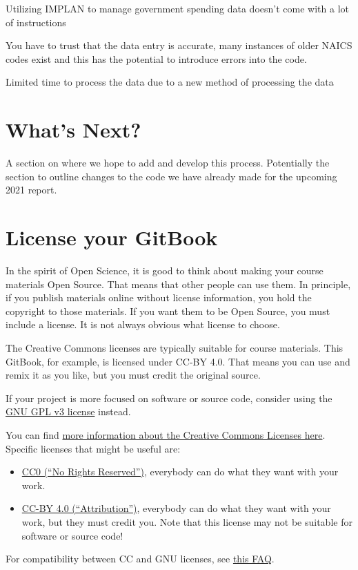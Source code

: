 \documentclass[
]{book}
\providecommand{\tightlist}{%
  \setlength{\itemsep}{0pt}\setlength{\parskip}{0pt}}
\begin{document}
Utilizing IMPLAN to manage government spending data doesn't come with a lot of instructions

You have to trust that the data entry is accurate, many instances of older NAICS codes exist and this has the potential to introduce errors into the code.

Limited time to process the data due to a new method of processing the data

\hypertarget{whats-next}{%
\chapter{What's Next?}\label{whats-next}}

A section on where we hope to add and develop this process. Potentially the section to outline changes to the code we have already made for the upcoming 2021 report.

\hypertarget{license-your-gitbook}{%
\chapter{License your GitBook}\label{license-your-gitbook}}

In the spirit of Open Science, it is good to think about making your course materials Open Source. That means that other people can use them. In principle, if you publish materials online without license information, you hold the copyright to those materials. If you want them to be Open Source, you must include a license. It is not always obvious what license to choose.

The Creative Commons licenses are typically suitable for course materials. This GitBook, for example, is licensed under CC-BY 4.0. That means you can use and remix it as you like, but you must credit the original source.

If your project is more focused on software or source code, consider using the \href{https://www.gnu.org/licenses/gpl-3.0.en.html}{GNU GPL v3 license} instead.

You can find \href{https://creativecommons.org/share-your-work/licensing-examples}{more information about the Creative Commons Licenses here}. Specific licenses that might be useful are:

\begin{itemize}
\tightlist
\item
  \href{https://creativecommons.org/share-your-work/public-domain/cc0/}{CC0 (``No Rights Reserved'')}, everybody can do what they want with your work.
\item
  \href{https://creativecommons.org/licenses/by/4.0/}{CC-BY 4.0 (``Attribution'')}, everybody can do what they want with your work, but they must credit you. Note that this license may not be suitable for software or source code!
\end{itemize}

For compatibility between CC and GNU licenses, see \href{https://creativecommons.org/faq/\#Can_I_apply_a_Creative_Commons_license_to_software.3F}{this FAQ}.

  
\end{document}
